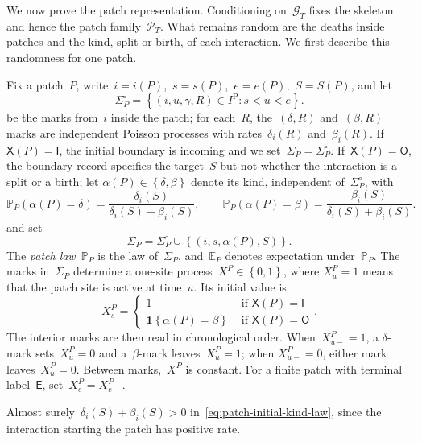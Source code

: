 \documentclass[EJP,preprint,NODS,nobera]{ejpecp}
\newcommand{\pP}{\mathbb{P}}
\newcommand{\E}{\mathbb{E}}
\newcommand{\bb}[1]{\left(#1\right)}
\newcommand{\cb}[1]{\left\{#1\right\}}
\newcommand{\ind}{\mathbf{1}}
\newcommand{\pw}[4]{\left\{\begin{array}{cl}
  #1 &\text{ if } #2 \\
  #3 &\text{ if } #4
\end{array}\right.}
\newcommand{\chg}[1]{{\color{changegreen}#1}}
\begin{document}
\chg{We now prove the patch representation. Conditioning on~$\mathcal G_T$
fixes the skeleton and hence the patch family~$\mathcal P_T$. What remains
random are the deaths inside patches and the kind, split or birth, of each
interaction. We first describe this randomness for one patch.}

\chg{\begin{definition}
\label{def:patch-law}
Fix a patch~$P$, write~$i=i(P)$,~$s=s(P)$,~$e=e(P)$,~$S=S(P)$, and let
\begin{equation*}
\Sigma_P^\circ
=
\cb{(i,u,\gamma,R)\in I^{\mathrm P}:s<u<e}.
\end{equation*}
be the marks from~$i$ inside the patch; for each~$R$, the~$(\delta,R)$
and~$(\beta,R)$ marks are independent Poisson processes with
rates~$\delta_i(R)$ and~$\beta_i(R)$. If~$\mathsf X(P)=\mathsf I$, the initial
boundary is incoming and we set~$\Sigma_P=\Sigma_P^\circ$.
If~$\mathsf X(P)=\mathsf O$, the boundary record specifies the target~$S$ but
not whether the interaction is a split or a birth; let
$\alpha(P)\in\cb{\delta,\beta}$ denote its kind, independent
of~$\Sigma_P^\circ$, with
\begin{equation}
\label{eq:patch-initial-kind-law}
\pP_P\bb{\alpha(P)=\delta}
=
\frac{\delta_i(S)}{\delta_i(S)+\beta_i(S)},
\qquad
\pP_P\bb{\alpha(P)=\beta}
=
\frac{\beta_i(S)}{\delta_i(S)+\beta_i(S)}.
\end{equation}
and set
\begin{equation*}
\Sigma_P
=
\Sigma_P^\circ\cup\cb{(i,s,\alpha(P),S)}.
\end{equation*}
The \emph{patch law}~$\pP_P$ is the law of~$\Sigma_P$, and~$\E_P$ denotes
expectation under~$\pP_P$.
The marks in~$\Sigma_P$ determine a one-site process~$X^P\in\cb{0,1}$, where
$X_u^P=1$ means that the patch site is active at time~$u$. Its initial value is
\begin{equation*}
X_s^P
=
\pw{1}{\mathsf X(P)=\mathsf I}
{\ind\cb{\alpha(P)=\beta}}{\mathsf X(P)=\mathsf O}.
\end{equation*}
The interior marks are then read in chronological order. When~$X_{u-}^P=1$, a
$\delta$-mark sets~$X_u^P=0$ and a~$\beta$-mark leaves~$X_u^P=1$; when
$X_{u-}^P=0$, either mark leaves~$X_u^P=0$. Between marks,~$X^P$ is constant.
For a finite patch with terminal label~$\mathsf E$, set~$X_e^P=X_{e-}^P$.
\end{definition}}

\chg{Almost surely~$\delta_i(S)+\beta_i(S)>0$ in~\eqref{eq:patch-initial-kind-law},
since the interaction starting the patch has positive rate.}
\end{document}

